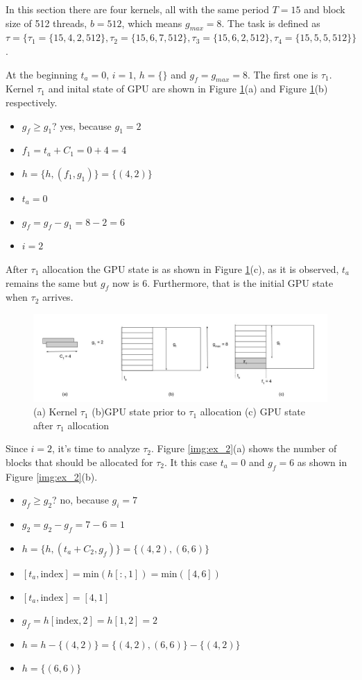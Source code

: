 \documentclass[
  12pt,
  a4paperpaper,
]{report}
\providecommand{\tightlist}{%
  \setlength{\itemsep}{0pt}\setlength{\parskip}{0pt}}
\begin{document}
In this section there are four kernels, all with the same
period \(T = 15\) and block size of 512 threads, \(b = 512\), which
means \(g_{max} = 8\). The task is defined as
\(\tau = \{\tau_1 = \{15, 4, 2, 512\} , \tau_2 = \{15, 6,7,512\}, \tau_3 = \{15, 6,2,512\}, \tau_4 =\{ 15, 5,5,512\} \}\).

At the beginning \(t_a =0\), \(i=1\), \(h=\{\}\) and
\(g_f = g_{max} = 8\). The first one is \(\tau_1\). Kernel \(\tau_1\)
and inital state of GPU are shown in Figure \ref{img:ex_1}(a) and Figure
\ref{img:ex_1}(b) respectively.

\begin{itemize}
\tightlist
\item
  \(g_f \geq g_1\)? yes, because \(g_1 = 2\)
\item
  \(f_1 = t_a + C_1 = 0 + 4 = 4\)
\item
  \(h = \{h, (f_1, g_1)\} = \{ (4,2) \}\)
\item
  \(t_a = 0\)
\item
  \(g_f = g_f - g_1 = 8 - 2 = 6\)
\item
  \(i = 2\)
\end{itemize}

After \(\tau_1\) allocation the GPU state is as shown in Figure
\ref{img:ex_1}(c), as it is observed, \(t_a\) remains the same but
\(g_f\) now is 6. Furthermore, that is the initial GPU state when
\(\tau_2\) arrives.

\begin{figure}
\centering
\includegraphics{source/figures/ex_1.jpg}
\caption{(a) Kernel \(\tau_1\) (b)GPU state prior to \(\tau_1\)
allocation (c) GPU state after \(\tau_1\) allocation \label{img:ex_1}}
\end{figure}

Since \(i=2\), it's time to analyze \(\tau_2\). Figure \ref{img:ex_2}(a)
shows the number of blocks that should be allocated for \(\tau_2\). It
this case \(t_a = 0\) and \(g_f = 6\) as shown in Figure
\ref{img:ex_2}(b).

\begin{itemize}
\tightlist
\item
  \(g_f \geq g_2\)? no, because \(g_i = 7\)
\item
  \(g_2 = g_2 - g_f = 7-6 = 1\)
\item
  \(h = \{h, (t_a + C_2, g_f)\} = \{ (4,2), (6,6) \}\)
\item
  \([ t_a, \mathrm{index} ] = \mathrm{min}(h[:,1]) = \mathrm{min}([4,6])\)
\item
  \([ t_a, \mathrm{index} ] = [4,1]\)
\item
  \(g_f = h[ \mathrm{index},2] = h[1,2] = 2\)
\item
  \(h = h - \{ (4,2) \} = \{ (4,2), (6,6) \} - \{ (4,2) \}\)
\item
  \(h = \{(6,6)\}\)
\end{itemize}
\end{document}
